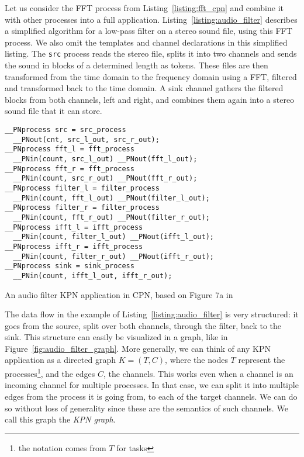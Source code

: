 Let us consider the \acs{FFT} process from Listing~\ref{listing:fft_cpn} and combine it with other processes into a full application.
Listing~\ref{listing:audio_filter} describes a simplified algorithm for a low-pass filter on a stereo sound file, using this \acs{FFT} process.
We also omit the templates and channel declarations in this simplified listing.
The \texttt{src} process reads the stereo file, splits it into two channels and sends the sound in blocks of a determined length as tokens.
These files are then transformed from the time domain to the frequency domain using a \acf{FFT}, filtered and transformed back to the time domain.
A sink channel gathers the filtered blocks from both channels, left and right, and combines them again into a stereo sound file that it can store.

\begin{listing}
\begin{verbatim}
__PNprocess src = src_process
  __PNout(cnt, src_l_out, src_r_out);
__PNprocess fft_l = fft_process
  __PNin(count, src_l_out) __PNout(fft_l_out);
__PNprocess fft_r = fft_process
  __PNin(count, src_r_out) __PNout(fft_r_out);
__PNprocess filter_l = filter_process
  __PNin(count, fft_l_out) __PNout(filter_l_out);
__PNprocess filter_r = filter_process
  __PNin(count, fft_r_out) __PNout(filter_r_out);
__PNprocess ifft_l = ifft_process
  __PNin(count, filter_l_out) __PNout(ifft_l_out);
__PNprocess ifft_r = ifft_process
  __PNin(count, filter_r_out) __PNout(ifft_r_out);
__PNprocess sink = sink_process
  __PNin(count, ifft_l_out, ifft_r_out);
\end{verbatim}
\caption{An audio filter \ac{KPN} application in \ac{CPN}, based on Figure 7a in \cite{cpn}}
\label{listing:audio_filter}
\end{listing}

The data flow in the example of Listing~\ref{listing:audio_filter} is very structured: it goes from the source, split over both channels, through the filter, back to the sink.
This structure can easily be visualized in a graph, like in Figure~\ref{fig:audio_filter_graph}.
More generally, we can think of any \ac{KPN} application as a directed graph $K = (T,C)$, where the nodes $T$ represent the processes\footnote{the notation comes from $T$ for tasks}, and the edges $C$, the channels.
This works even when a channel is an incoming channel for multiple processes.
In that case, we can split it into multiple edges from the process it is going from, to each of the target channels.
We can do so without loss of generality since these are the semantics of such channels. 
We call this graph the \emph{\ac{KPN} graph}.

